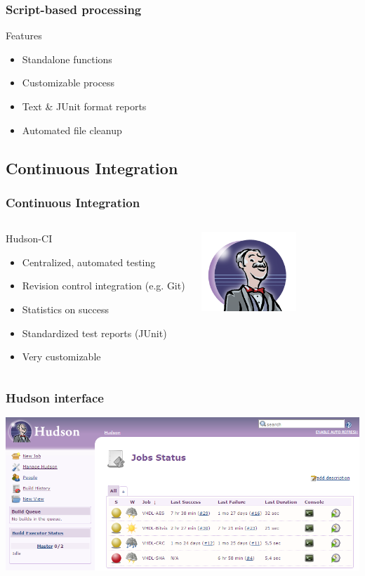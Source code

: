 \documentclass[british,10pt]{beamer}
\begin{document}
\begin{frame}\frametitle{Script-based processing}
Features
\begin{itemize}
\item Standalone functions
\item Customizable process
\item Text \& JUnit format reports
\item Automated file cleanup
\end{itemize}
\end{frame}

\subsection{Continuous Integration}

\begin{frame}\frametitle{Continuous Integration}
\begin{columns}
\begin{column}{0.6\textwidth}
Hudson-CI
\begin{itemize}
\item Centralized, automated testing
\item Revision control integration (e.g. Git)
\item Statistics on success
\item Standardized test reports (JUnit)
\item Very customizable
\end{itemize}
\end{column}
\includegraphics[width=0.6\textwidth]{images/hudson.png}
\end{columns}
\end{frame}

\begin{frame}\frametitle{Hudson interface}
\centering
\includegraphics[width=\textwidth]{images/hudsoninterface.png}
\end{frame}
\end{document}
